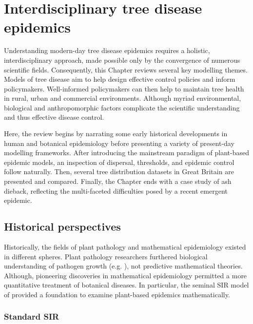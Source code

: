 \chapter{Interdisciplinary tree disease epidemics}
\label{chapter2:litreview} 

Understanding modern-day tree disease epidemics requires a holistic, interdisciplinary
approach, made possible only by the convergence of numerous scientific fields. 
Consequently, this Chapter reviews several key modelling themes.
Models of tree disease aim to help design effective control policies and inform policymakers.
Well-informed policymakers can then help to maintain tree health in rural, urban and commercial environments. 
Although myriad environmental, biological and anthropomorphic factors complicate the scientific understanding 
and thus effective disease control. 

Here, the review begins by narrating some early historical developments in human and botanical epidemiology before presenting
a variety of present-day modelling frameworks. After introducing the mainstream paradigm of plant-based epidemic models,
an inspection of dispersal, thresholds, and epidemic control follow naturally. Then, several tree distribution datasets in Great Britain are presented and compared. Finally, the Chapter ends with a case study of ash dieback, reflecting the multi-faceted 
difficulties posed by a recent emergent epidemic.

\newpage

\section{Historical perspectives}

Historically, the fields of plant pathology and mathematical epidemiology existed in different spheres.
Plant pathology researchers furthered biological understanding of pathogen growth (e.g. \cite{doi:10.1146/annurev.py.01.090163.000245}), not predictive mathematical theories.
Although, pioneering discoveries in mathematical epidemiology permitted a more quantitative treatment of botanical diseases. 
In particular, the seminal SIR model of \cite{kermack-model} 
provided a foundation to examine plant-based epidemics mathematically.

\subsection{Standard SIR}

